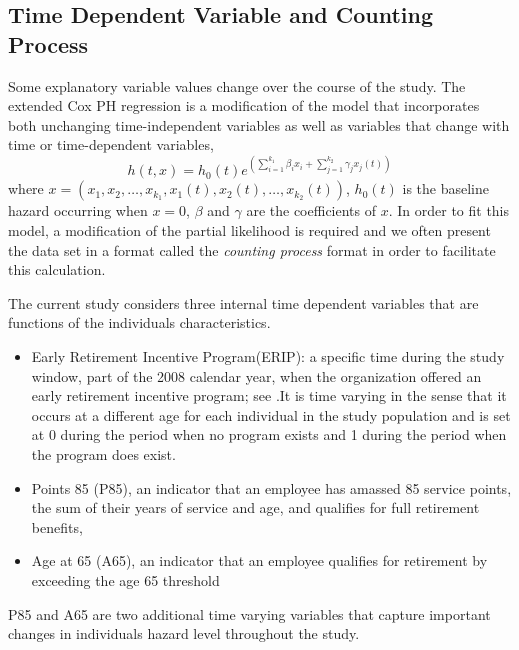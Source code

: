 \documentclass[12pt,letterpaper]{article}
\begin{document}
\subsection{Time Dependent Variable and Counting Process}
\label{sec:coxt}
Some explanatory variable values change over the course of the study. The extended Cox PH regression is a modification of the model that incorporates both unchanging time-independent variables as well as variables that change with time or time-dependent variables,
\begin{equation}
	\label{eq:timecovar}
	h(t,x)=h_0(t)e^{(\sum_{i=1}^{k_1}\beta_ix_i+\sum_{j=1}^{k_2}\gamma_jx_j(t))}
\end{equation}
where $x=(x_1, x_2, \ldots, x_{k_1}, x_1(t), x_2(t), \ldots, x_{k_2}(t))$, $h_0(t)$ is the baseline hazard occurring when $x=0$, $\beta$ and $\gamma$ are the coefficients of $x$. In order to fit this model, a modification of the partial likelihood is required and we often present the data set in a format called the {\it counting process} format in order to facilitate this calculation.

The current study considers three internal time dependent variables that are functions of the individuals characteristics.

\begin{itemize}
\item Early Retirement Incentive Program(ERIP): a specific time during the study window, part of the 2008 calendar year, when the organization offered an early retirement incentive program; see \citep{ERIP}.It is time varying in the sense that it occurs at a different age for each individual in the study population and is set at 0 during the period when no program exists and 1 during the period when the program does exist. 
\item Points 85 (P85), an indicator that an employee has amassed 85 service points, the sum of their years of service and age, and qualifies for full retirement benefits, 
\item Age at 65 (A65), an indicator that an employee qualifies for retirement by exceeding the age 65 threshold
\end{itemize}
P85 and A65 are two additional time varying variables that capture important changes in individuals hazard level throughout the study.

\end{document}
